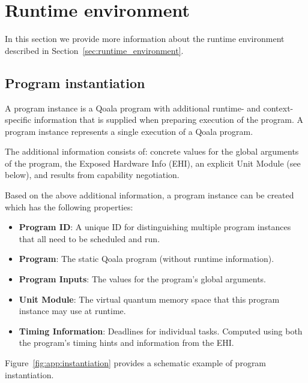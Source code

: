 \section{Runtime environment}
\label{sec:app:runtime_environment}
In this section we provide more information about the runtime environment described in Section~\ref{sec:runtime_environment}.

\subsection{Program instantiation}
A program instance is a Qoala program with additional runtime- and context-specific information that is supplied when preparing execution of the program.
A program instance represents a single execution of a Qoala program.

The additional information consists of:
concrete values for the global arguments of the program,
the Exposed Hardware Info (EHI),
an explicit Unit Module (see below), and
results from capability negotiation.

Based on the above additional information, a program instance can be created which has the following properties:
\begin{itemize}
\item \textbf{Program ID}: A unique ID for distinguishing multiple program instances that all need to be scheduled and run.
\item \textbf{Program}: The static Qoala program (without runtime information).
\item \textbf{Program Inputs}: The values for the program's global arguments.
\item \textbf{Unit Module}: The virtual quantum memory space that this program instance may use at runtime.
\item \textbf{Timing Information}: Deadlines for individual tasks. Computed using both the program's timing hints and information from the EHI.
\end{itemize}

Figure~\ref{fig:app:instantiation} provides a schematic example of program instantiation.


